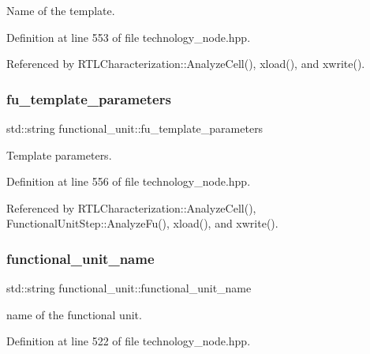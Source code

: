 Name of the template. 



Definition at line 553 of file technology\+\_\+node.\+hpp.



Referenced by R\+T\+L\+Characterization\+::\+Analyze\+Cell(), xload(), and xwrite().

\mbox{\label{structfunctional__unit_aa44cc9ed9f004fef4c2b23eda1543e96}} 
\subsubsection{\texorpdfstring{fu\+\_\+template\+\_\+parameters}{fu\_template\_parameters}}
{\footnotesize\ttfamily std\+::string functional\+\_\+unit\+::fu\+\_\+template\+\_\+parameters}



Template parameters. 



Definition at line 556 of file technology\+\_\+node.\+hpp.



Referenced by R\+T\+L\+Characterization\+::\+Analyze\+Cell(), Functional\+Unit\+Step\+::\+Analyze\+Fu(), xload(), and xwrite().

\mbox{\label{structfunctional__unit_aaec37da166bb4179edfe4f8d1faaa157}} 
\subsubsection{\texorpdfstring{functional\+\_\+unit\+\_\+name}{functional\_unit\_name}}
{\footnotesize\ttfamily std\+::string functional\+\_\+unit\+::functional\+\_\+unit\+\_\+name}



name of the functional unit. 



Definition at line 522 of file technology\+\_\+node.\+hpp.



